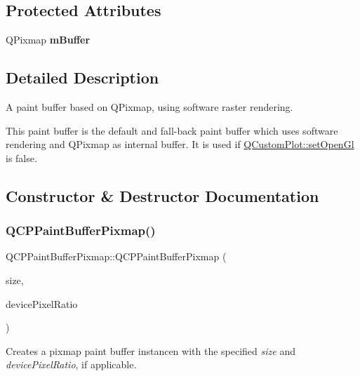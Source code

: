 \subsection*{Protected Attributes}
\begin{DoxyCompactItemize}
\item 
\mbox{\label{class_q_c_p_paint_buffer_pixmap_a6d7009f45f03e305f2dc00e52a9225f8}} 
Q\+Pixmap {\bfseries m\+Buffer}
\end{DoxyCompactItemize}


\subsection{Detailed Description}
A paint buffer based on Q\+Pixmap, using software raster rendering. 

This paint buffer is the default and fall-\/back paint buffer which uses software rendering and Q\+Pixmap as internal buffer. It is used if \mbox{\hyperlink{class_q_custom_plot_a7db1adc09016329f3aef7c60da935789}{Q\+Custom\+Plot\+::set\+Open\+Gl}} is false. 

\subsection{Constructor \& Destructor Documentation}
\mbox{\label{class_q_c_p_paint_buffer_pixmap_aef0224e03b9285509391fcd61a8e6844}} 
\subsubsection{\texorpdfstring{Q\+C\+P\+Paint\+Buffer\+Pixmap()}{QCPPaintBufferPixmap()}}
{\footnotesize\ttfamily Q\+C\+P\+Paint\+Buffer\+Pixmap\+::\+Q\+C\+P\+Paint\+Buffer\+Pixmap (\begin{DoxyParamCaption}\item[{const Q\+Size \&}]{size,  }\item[{double}]{device\+Pixel\+Ratio }\end{DoxyParamCaption})\hspace{0.3cm}{\ttfamily [explicit]}}

Creates a pixmap paint buffer instancen with the specified {\itshape size} and {\itshape device\+Pixel\+Ratio}, if applicable. 

